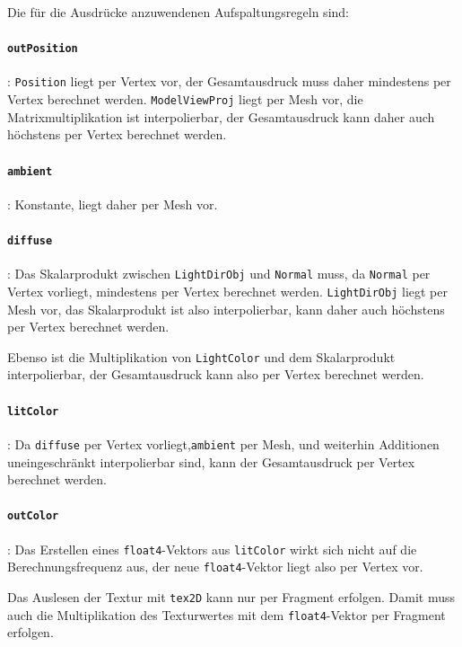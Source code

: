\documentclass[twoside,a4paper,fleqn,12pt]{book}
\begin{document}
Die für die Ausdrücke anzuwendenen Aufspaltungsregeln sind:

\paragraph{\texttt{outPosition}}: \texttt{Position} liegt per Vertex vor, der Gesamtausdruck muss daher mindestens per Vertex
berechnet werden. \texttt{ModelViewProj} liegt per Mesh vor, die Matrixmultiplikation ist interpolierbar,
der Gesamtausdruck kann daher auch höchstens per Vertex berechnet werden.

\paragraph{\texttt{ambient}}: Konstante, liegt daher per Mesh vor.

\paragraph{\texttt{diffuse}}: Das Skalarprodukt zwischen \texttt{LightDirObj} und \texttt{Normal} muss, da \texttt{Normal} per Vertex vorliegt,
mindestens per Vertex berechnet werden. \texttt{LightDirObj} liegt per Mesh vor, das Skalarprodukt ist also interpolierbar,
kann daher auch höchstens per Vertex berechnet werden.

Ebenso ist die Multiplikation von \texttt{LightColor} und dem Skalarprodukt interpolierbar, der Gesamtausdruck kann also per Vertex
berechnet werden.

\paragraph{\texttt{litColor}}: Da \texttt{diffuse} per Vertex vorliegt,\texttt{ambient} per Mesh, und weiterhin
Additionen uneingeschränkt interpolierbar sind, kann der Gesamtausdruck per Vertex berechnet werden.

\paragraph{\texttt{outColor}}: Das Erstellen eines \texttt{float4}-Vektors aus \texttt{litColor} wirkt sich nicht 
auf die Berechnungsfrequenz aus, der neue \texttt{float4}-Vektor liegt also per Vertex vor.

Das Auslesen der Textur mit \texttt{tex2D} kann nur per Fragment erfolgen. Damit muss auch die Multiplikation des Texturwertes mit
dem \texttt{float4}-Vektor per Fragment erfolgen.
\end{document}
